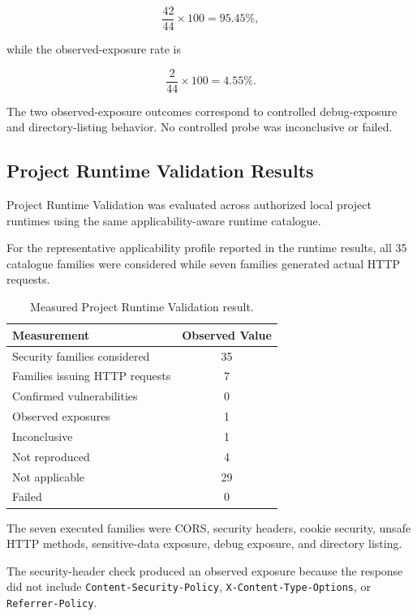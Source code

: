 \documentclass[journal]{IEEEtran}
\begin{document}
\begin{equation}
\frac{42}{44}\times100
=
95.45\%,
\end{equation}

while the observed-exposure rate is

\begin{equation}
\frac{2}{44}\times100
=
4.55\%.
\end{equation}

The two observed-exposure outcomes correspond to controlled debug-exposure
and directory-listing behavior. No controlled probe was inconclusive or
failed.

\subsection{Project Runtime Validation Results}

Project Runtime Validation was evaluated across authorized local project
runtimes using the same applicability-aware runtime catalogue.

For the representative applicability profile reported in the runtime
results, all 35 catalogue families were considered while seven families
generated actual HTTP requests.

\begin{table}[!t]
\centering
\caption{Measured Project Runtime Validation result.}
\label{tab:project-runtime-results}
\begin{tabular}{lc}
\toprule
\textbf{Measurement} & \textbf{Observed Value} \\
\midrule
Security families considered & 35 \\
Families issuing HTTP requests & 7 \\
Confirmed vulnerabilities & 0 \\
Observed exposures & 1 \\
Inconclusive & 1 \\
Not reproduced & 4 \\
Not applicable & 29 \\
Failed & 0 \\
\bottomrule
\end{tabular}
\end{table}

The seven executed families were CORS, security headers, cookie security,
unsafe HTTP methods, sensitive-data exposure, debug exposure, and directory
listing.

The security-header check produced an observed exposure because the response
did not include \texttt{Content-Security-Policy},
\texttt{X-Content-Type-Options}, or
\texttt{Referrer-Policy}.
\end{document}
